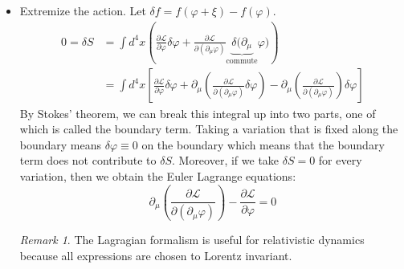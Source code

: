 \documentclass{report}
\theoremstyle{plain}
\theoremstyle{definition}
\theoremstyle{remark}
\newtheorem*{remark}{Remark}
\newcommand{\FR}[2]{\frac{#1}{#2}}
\newcommand{\mc}{\mathcal}
\newcommand{\vphi}{\varphi}
\newcommand{\di}{\partial}
\newcommand{\ddi}[2]{\FR{\partial {#1}}{\partial {#2}}}
\begin{document}
\begin{itemize}
\item Extremize the action. Let $\delta f = f(\vphi+\xi) - f(\vphi)$.
    \begin{align*}
        0 = \delta S &= \int d^4 x \left( \ddi{\mc L}{\vphi}\delta\vphi
        +\ddi{\mc L}{(\di_\mu \vphi)}
        \underbrace{\delta(\di_\mu}_{\text{commute}}\vphi)\right)\\
        &= \int d^4 x \left[ \ddi{\mc L}{\vphi}\delta\vphi
        + \di_\mu \left(  \ddi{\mc L}{(\di_\mu\vphi)}\delta\vphi \right)
    - \di_\mu \left(\ddi{\mc L}{(\di_\mu\vphi)}\right)\delta\vphi \right]
    \end{align*}
    By Stokes' theorem, we can break this integral up into two parts, one
    of which is called the boundary term. Taking a variation that is fixed
    along the boundary means $\delta\vphi \equiv 0$ on the boundary which
    means that the boundary term does not contribute to $\delta S$.
    Moreover, if we take $\delta S = 0$ for every variation, then we obtain
    the Euler Lagrange equations:
    \[ \di_\mu \left( \ddi{\mc L}{(\di_\mu \vphi)} \right) - \ddi{\mc
    L}{\vphi} = 0 \]

    \begin{remark}
        The Lagragian formalism is useful for relativistic dynamics because
        all expressions are chosen to Lorentz invariant.
    \end{remark}
    \end{itemize}
\end{document}
